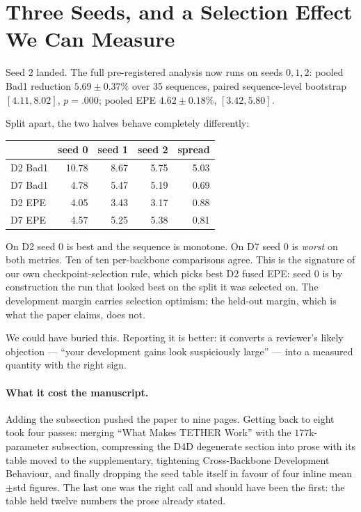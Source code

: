 \documentclass[11pt,a4paper]{article}
\begin{document}
\section*{Three Seeds, and a Selection Effect We Can Measure}

Seed 2 landed. The full pre-registered analysis now runs on seeds
$0,1,2$: pooled Bad1 reduction $5.69\pm0.37\%$ over 35 sequences, paired
sequence-level bootstrap $[4.11,8.02]$, $p=.000$; pooled EPE
$4.62\pm0.18\%$, $[3.42,5.80]$.

Split apart, the two halves behave completely differently:

\begin{center}
\footnotesize
\begin{tabular}{@{}lrrrr@{}}
\toprule
& seed 0 & seed 1 & seed 2 & spread \\
\midrule
D2 Bad1 & 10.78 & 8.67 & 5.75 & 5.03 \\
D7 Bad1 &  4.78 & 5.47 & 5.19 & 0.69 \\
D2 EPE  &  4.05 & 3.43 & 3.17 & 0.88 \\
D7 EPE  &  4.57 & 5.25 & 5.38 & 0.81 \\
\bottomrule
\end{tabular}
\end{center}

On D2 seed 0 is best and the sequence is monotone. On D7 seed 0 is
\emph{worst} on both metrics. Ten of ten per-backbone comparisons agree.
This is the signature of our own checkpoint-selection rule, which picks
best D2 fused EPE: seed 0 is by construction the run that looked best on
the split it was selected on. The development margin carries selection
optimism; the held-out margin, which is what the paper claims, does not.

We could have buried this. Reporting it is better: it converts a
reviewer's likely objection --- ``your development gains look
suspiciously large'' --- into a measured quantity with the right sign.

\paragraph{What it cost the manuscript.} Adding the subsection pushed the
paper to nine pages. Getting back to eight took four passes: merging
``What Makes TETHER Work'' with the $177$k-parameter subsection,
compressing the D4D degenerate section into prose with its table moved to
the supplementary, tightening Cross-Backbone Development Behaviour, and
finally dropping the seed table itself in favour of four inline
mean$\pm$std figures. The last one was the right call and should have
been the first: the table held twelve numbers the prose already stated.
\end{document}
